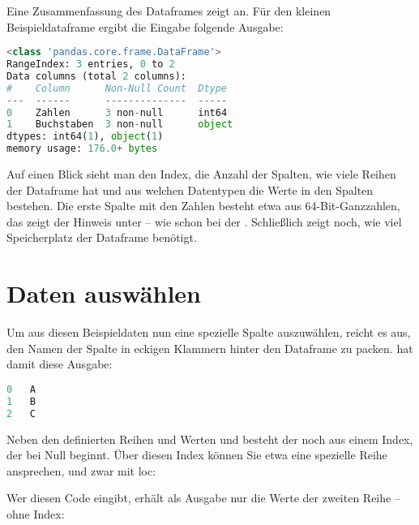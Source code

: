 Eine Zusammenfassung des Dataframes zeigt  an. Für den kleinen Beispieldataframe ergibt die Eingabe  folgende Ausgabe:

\medskip

\begin{lstlisting}[language=Python]
<class 'pandas.core.frame.DataFrame'>
RangeIndex: 3 entries, 0 to 2
Data columns (total 2 columns):
#    Column      Non-Null Count  Dtype
---  ------      --------------  -----
0    Zahlen      3 non-null      int64
1    Buchstaben  3 non-null      object
dtypes: int64(1), object(1)
memory usage: 176.0+ bytes
\end{lstlisting}

\medskip

Auf einen Blick sieht man den Index, die Anzahl der Spalten, wie viele Reihen der Dataframe hat und aus welchen Datentypen die Werte in den Spalten bestehen. Die erste Spalte mit den Zahlen besteht etwa aus 64-Bit-Ganzzahlen, das zeigt der Hinweis  unter  -- wie schon bei der . Schließlich zeigt  noch, wie viel Speicherplatz der Dataframe benötigt.


\section{Daten auswählen}

Um aus diesen Beispieldaten nun eine spezielle Spalte auszuwählen, reicht es aus, den Namen der Spalte in eckigen Klammern hinter den Dataframe zu packen.  hat damit diese Ausgabe:

\medskip

\begin{lstlisting}[language=Python]
0	A
1	B
2	C
\end{lstlisting}

\medskip

Neben den definierten Reihen und Werten und besteht der  noch aus einem Index, der bei Null beginnt. Über diesen Index können Sie etwa eine spezielle Reihe ansprechen, und zwar mit loc:

\medskip


\medskip

Wer diesen Code eingibt, erhält als Ausgabe nur die Werte der zweiten Reihe -- ohne Index:

\medskip

